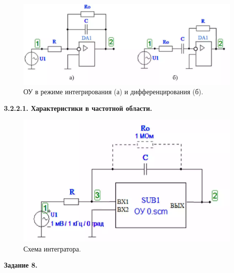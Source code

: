 \documentclass[a4paper,14pt]{extarticle}
\begin{document}
    \begin{figure}[h!]
        \begin{center}
            \includegraphics[scale=0.4]{18.png}
        \end{center}
        \vspace{-0.7cm}
        \caption{ОУ в режиме интегрирования (а) и дифференцирования (б).}
    \end{figure}

    \newpage
    \begin{center}
        \textbf{3.2.2.1. Характеристики в частотной области.}
    \end{center}

    \begin{figure}[h!]
        \begin{center}
            \includegraphics[scale=0.5]{19.png}
        \end{center}
        \vspace{-0.7cm}
        \caption{Схема интегратора.}
    \end{figure}

    \newpage
    \begin{center}
        \textbf{Задание 8.}
    \end{center}
\end{document}
